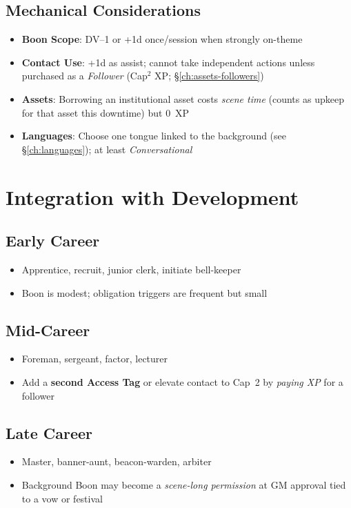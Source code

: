 \begin{multicols}{2}
\subsection*{Mechanical Considerations}
\begin{itemize}
\item \textbf{Boon Scope}: DV--1 or +1d once/session when strongly on-theme
\item \textbf{Contact Use}: +1d as assist; cannot take independent actions unless purchased as a \emph{Follower} (Cap$^2$ XP; \S\ref{ch:assets-followers})
\item \textbf{Assets}: Borrowing an institutional asset costs \emph{scene time} (counts as upkeep for that asset this downtime) but \(0\)~XP
\item \textbf{Languages}: Choose one tongue linked to the background (see \S\ref{ch:languages}); at least \emph{Conversational}
\end{itemize}

\section{Integration with Development}

\subsection*{Early Career}
\begin{itemize}
\item Apprentice, recruit, junior clerk, initiate bell-keeper
\item Boon is modest; obligation triggers are frequent but small
\end{itemize}

\subsection*{Mid-Career}
\begin{itemize}
\item Foreman, sergeant, factor, lecturer
\item Add a \textbf{second Access Tag} or elevate contact to Cap~2 by \emph{paying XP} for a follower
\end{itemize}

\subsection*{Late Career}
\begin{itemize}
\item Master, banner-aunt, beacon-warden, arbiter
\item Background Boon may become a \emph{scene-long permission} at GM approval tied to a vow or festival
\end{itemize}


\end{multicols}
